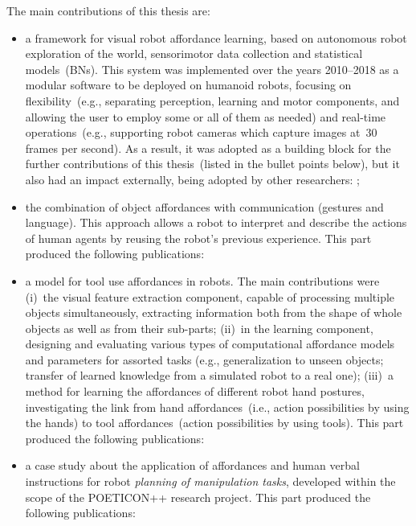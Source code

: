 The main contributions of this thesis are:
\begin{itemize}
\item a framework for visual robot affordance learning, based on autonomous robot exploration of the world, sensorimotor data collection and statistical models~(\aclp{BN}).
This system was implemented over the years 2010--2018 as a modular software to be deployed on humanoid robots, focusing on flexibility~(e.g., separating perception, learning and motor components, and allowing the user to employ some or all of them as needed) and real-time operations~(e.g., supporting robot cameras which capture images at~$30$ frames per second).
As a result, it was adopted as a building block for the further contributions of this thesis~(listed in the bullet points below), but it also had an impact externally, being adopted by other researchers: \cite{morse:2016:cogsci,dehban:2016:eccvws,dehban:2016:icra,dehban:2017:humanoids};

\item the combination of object affordances with communication (gestures and language).
This approach allows a robot to interpret and describe the actions of human agents by reusing the robot's previous experience.
This part produced the following publications:
\listPublicationsGestures

\item a model for tool use affordances in robots.
The main contributions were
(i)~the visual feature extraction component, capable of processing multiple objects simultaneously, extracting information both from the shape of whole objects as well as from their sub-parts;
(ii)~in the learning component, designing and evaluating various types of computational affordance models and parameters for assorted tasks (e.g., generalization to unseen objects; transfer of learned knowledge from a simulated robot to a real one);
(iii)~a method for learning the affordances of different robot hand postures, investigating the link from hand affordances~(i.e., action possibilities by using the hands) to tool affordances~(action possibilities by using tools).
This part produced the following publications:
\listPublicationsTools

\item a case study about the application of affordances and human verbal instructions for robot \emph{planning of manipulation tasks}, developed within the scope of the POETICON++ research project.
This part produced the following publications:
\listPublicationsPoeticonpp


\end{itemize}

